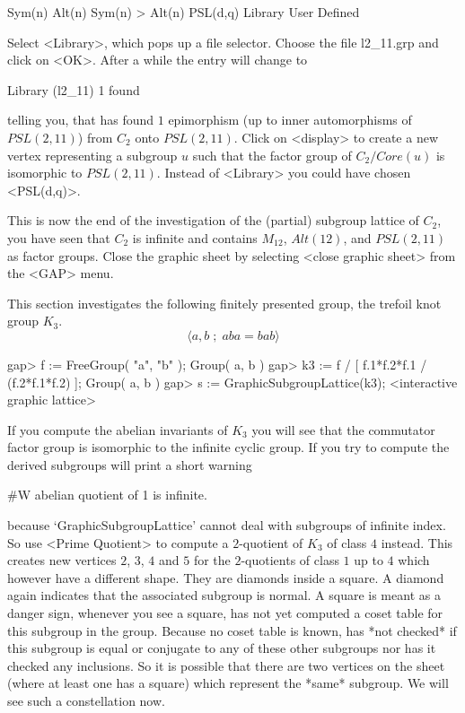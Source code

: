 \begintt
Sym(n)
Alt(n)
Sym(n) > Alt(n)
PSL(d,q)
Library
User Defined 
\endtt

Select  <Library>, which  pops   up a file  selector.   Choose  the  file
\begintt
l2_11.grp
\endtt and click on <OK>.  After a while the entry will change to

\begintt
Library (l2_11)      1 found 
\endtt

telling  you,  that  {\GAP}  has   found $1$  epimorphism   (up to  inner
automorphisms  of  $PSL(2,11)$) from  $C_2$   onto $PSL(2,11)$.  Click on
<display> to create a  new vertex representing a  subgroup $u$ such  that
the   factor group of  $C_2  /  Core(u)$  is  isomorphic to  $PSL(2,11)$.
Instead of <Library> you could have chosen <PSL(d,q)>.

This  is now  the  end of  the investigation   of the (partial)  subgroup
lattice  of $C_2$, you have  seen  that $C_2$   is infinite and  contains
$M_{12}$, $Alt(12)$, and $PSL(2,11)$ as factor groups.  Close the graphic
sheet by selecting <close graphic sheet> from the <GAP> menu.


This  section  investigates the  following  finitely presented group, the
trefoil knot group $K_3$.
$$
    \langle a, b \;;\; aba = bab \rangle
$$

\begintt
gap> f := FreeGroup( "a", "b" );
Group( a, b )
gap> k3 := f / [ f.1*f.2*f.1 / (f.2*f.1*f.2) ];
Group( a, b )
gap> s := GraphicSubgroupLattice(k3);
<interactive graphic lattice> 
\endtt

If you compute the   abelian invariants of  $K_3$  you will see  that the
commutator factor group  is isomorphic to the  infinite cyclic group.  If
you try  to compute the   derived subgroups  {\GAP}  will print  a  short
warning

\begintt
#W  abelian quotient of 1 is infinite. 
\endtt

because  `GraphicSubgroupLattice'  cannot   deal  with subgroups of  infinite
index.  So  use <Prime Quotient> to   compute a $2$-quotient  of $K_3$ of
class $4$ instead.  This creates new vertices $2$, $3$, $4$ and $5$ for
the $2$-quotients of  class $1$ up to $4$  which however have a different
shape. They are diamonds inside a square.  A diamond again indicates that
the associated subgroup  is normal.  A square is  meant as a danger sign,
whenever you see a square, {\GAP} has not yet  computed a coset table for
this subgroup in the group.  Because no coset  table is known, {\GAP} has
*not  checked* if this  subgroup is  equal or conjugate   to any of these
other  subgroups nor has  it checked  any  inclusions.  So it is possible
that  there are two  vertices on  the sheet (where    at least one has  a
square) which   represent  the *same* subgroup.    We   will see  such  a
constellation now.


